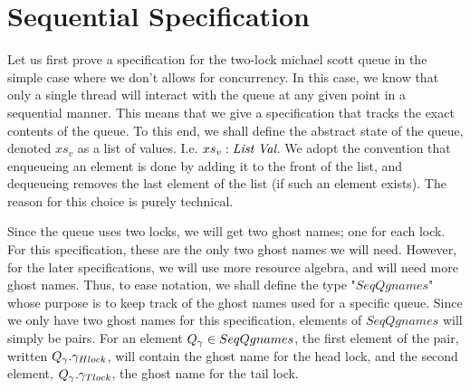 \documentclass[twoside,11pt,openright]{report}
\newcommand{\acquire}{\operatorname{acquire}}
\newcommand{\release}{\operatorname{release}}
\newcommand{\dequeue}{\operatorname{dequeue}}
\begin{document}


\section{Sequential Specification}
\label{TLMSQ:section:sequential}

Let us first prove a specification for the two-lock michael scott queue in the simple case where we don't allows for concurrency. In this case, we know that only a single thread will interact with the queue at any given point in a sequential manner. This means that we give a specification that tracks the exact contents of the queue. To this end, we shall define the abstract state of the queue, denoted $xs_v$ as a list of \heaplang values. I.e. $xs_v : \List \ \Val$. We adopt the convention that enqueueing an element is done by adding it to the front of the list, and dequeueing removes the last element of the list (if such an element exists). The reason for this choice is purely technical.

Since the queue uses two locks, we will get two ghost names; one for each lock. For this specification, these are the only two ghost names we will need. However, for the later specifications, we will use more resource algebra, and will need more ghost names. Thus, to ease notation, we shall define the type "$SeqQgnames$" whose purpose is to keep track of the ghost names used for a specific queue. Since we only have two ghost names for this specification, elements of $SeqQgnames$ will simply be pairs. For an element $Q_\gamma \in SeqQgnames$, the first element of the pair, written $Q_\gamma.\gamma_{Hlock}$, will contain the ghost name for the head lock, and the second element, $Q_\gamma.\gamma_{Tlock}$, the ghost name for the tail lock.
\end{document}
